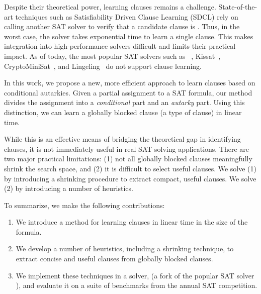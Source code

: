 Despite their theoretical power, learning \pr clauses remains a challenge. State-of-the-art techniques such as Satisfiability Driven Clause Learning (SDCL) rely on calling another SAT solver to verify that a candidate clause is \pr \cite{sadical}. 
Thus, in the worst case, the solver takes exponential time to learn a single \pr clause. This makes integration into high-performance solvers difficult and limits their practical impact. As of today, the most popular SAT solvers such as \cadical~\cite{cadical}, Kissat~\cite{kissat}, CryptoMiniSat~\cite{cryptominisat}, and Lingeling~\cite{lingeling} do not support \pr clause learning.

In this work, we propose a new, more efficient approach to learn \pr clauses based on conditional autarkies. Given a partial assignment to a SAT formula, our method divides the assignment into a \emph{conditional} part and an \emph{autarky} part. Using this distinction, we can learn a globally blocked clause (a type of \pr clause) in linear time.

While this is an effective means of bridging the theoretical gap in identifying \pr clauses, it is not immediately useful in real SAT solving applications. There are two major practical limitations: (1) not all globally blocked clauses meaningfully shrink the search space, and (2) it is difficult to select useful clauses. We solve (1) by introducing a shrinking procedure to extract compact, useful \pr clauses. We solve (2) by introducing a number of heuristics.



To summarize, we make the following contributions: 

\begin{enumerate} 
    \item We introduce a method for learning \pr clauses in linear time in the size of the formula. 
    \item We develop a number of heuristics, including a shrinking technique, to extract concise and useful \pr clauses from globally blocked clauses. 
    \item We implement these techniques in a solver, \tool (a fork of the popular SAT solver \cadical), and evaluate it on a suite of benchmarks from the annual SAT competition.
\end{enumerate}